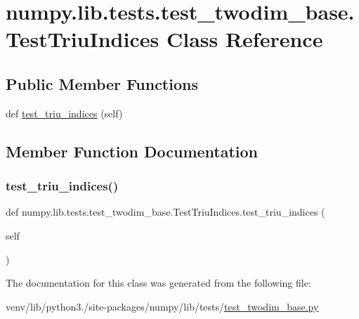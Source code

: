 \hypertarget{classnumpy_1_1lib_1_1tests_1_1test__twodim__base_1_1TestTriuIndices}{}\section{numpy.\+lib.\+tests.\+test\+\_\+twodim\+\_\+base.\+Test\+Triu\+Indices Class Reference}
\label{classnumpy_1_1lib_1_1tests_1_1test__twodim__base_1_1TestTriuIndices}
\subsection*{Public Member Functions}
\begin{DoxyCompactItemize}
\item 
def \hyperlink{classnumpy_1_1lib_1_1tests_1_1test__twodim__base_1_1TestTriuIndices_a8ca17e1ddf5eeffd90022d5df8126b7b}{test\+\_\+triu\+\_\+indices} (self)
\end{DoxyCompactItemize}


\subsection{Member Function Documentation}
\mbox{\label{classnumpy_1_1lib_1_1tests_1_1test__twodim__base_1_1TestTriuIndices_a8ca17e1ddf5eeffd90022d5df8126b7b}} 
\subsubsection{\texorpdfstring{test\+\_\+triu\+\_\+indices()}{test\_triu\_indices()}}
{\footnotesize\ttfamily def numpy.\+lib.\+tests.\+test\+\_\+twodim\+\_\+base.\+Test\+Triu\+Indices.\+test\+\_\+triu\+\_\+indices (\begin{DoxyParamCaption}\item[{}]{self }\end{DoxyParamCaption})}



The documentation for this class was generated from the following file\+:\begin{DoxyCompactItemize}
\item 
venv/lib/python3./site-\/packages/numpy/lib/tests/\hyperlink{test__twodim__base_8py}{test\+\_\+twodim\+\_\+base.\+py}\end{DoxyCompactItemize}
